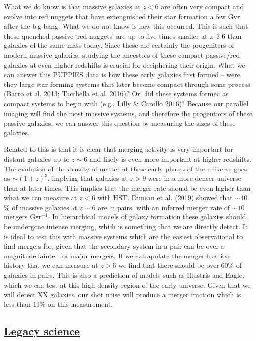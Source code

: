 \documentclass[12pt]{article}
\begin{document}
What we do know is that massive galaxies at $z < 6$ are often very compact and evolve into red nuggets that have extenguished their star formation a few Gyr after the big bang.  What we do not know is how this occurred.  This is such that these quenched passive ‘red nuggets’ are up to five times smaller at z~3-6 than galaxies of the same mass today.  Since these are certainly the progenitors of modern massive galaxies, studying the ancestors of these compact passive/red galaxies at even higher redshifts is crucial for deciphering their origin.   What we can answer this PUPPIES data is how these early galaxies first formed -- were they large star forming systems that later become compact through some process (Barro et al. 2013; Tacchella et al. 2016)? Or, did these systems formed as compact systems to begin with (e.g., Lilly & Carollo 2016)?   Because our parallel imaging will find the most massive systems, and therefore the progentiors of these passive galaxies, we can answer this question by measuring the sizes of these galaxies.

Related to this is that it is clear that merging activity is very important for distant galaxies up to $z \sim 6$ and likely is even more important at higher redshifts.  The evolution of the density of matter at these early phases of the universe goes as $\sim (1+z)^{3}$, implying that galaxies at $z > 9$ were in a more denser universe than at later times. This implies that the merger rate should be even higher than what we can measure at $z < 6$ with HST.  Duncan et al. (2019) showed that $\sim 40$\% of massive galaxies at $z \sim 6$ are in pairs, with an inferred merger rate of $\sim 10$ mergers Gyr$^{-1}$.  In hierarchical models of galaxy formation these galaxies should be undergone intense merging, which is something that we are directly detect. It is ideal to test this with massive systems which are the easiest observational to find mergers for, given that the secondary system in a pair can be over a magnitude fainter for major mergers.  If we extrapolate the merger fraction history that we can measure at $z > 6$ we find that there should be over 60\% of galaxies in pairs.  This is also a prediction of models such as Illustris and Eagle, which we can test at this high density region of the early universe.  Given that we will detect XX galaxies, our shot noise will produce a merger fraction which is less than 10\% on this measurement.  




\subsection{\bf \underline{Legacy science}}
\end{document}
